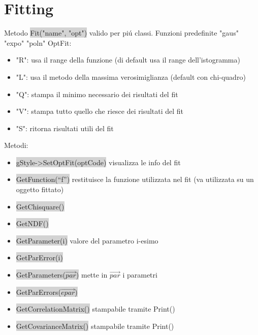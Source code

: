 \documentclass[a4paper]{article}
\begin{document}
\section{Fitting}
    Metodo \colorbox{LightGray}{Fit("name", "opt")} valido per pi\'u classi. Funzioni predefinite "gaus" "expo" "poln"
    OptFit:
    \begin{itemize}
        \item "R": usa il range della funzione (di default usa il range dell'istogramma)
        \item "L": usa il metodo della massima verosimiglianza (default con chi-quadro)
        \item "Q": stampa il minimo necessario dei risultati del fit
        \item "V": stampa tutto quello che riesce dei risultati del fit
        \item "S": ritorna risultati utili del fit
    \end{itemize}
    Metodi:
    \begin{itemize}
        \item \colorbox{LightGray}{gStyle->SetOptFit(optCode)} visualizza le info del fit
        \item \colorbox{LightGray}{GetFunction(“f”)} restituisce la funzione utilizzata nel fit (va utilizzata su un oggetto fittato)
        \item \colorbox{LightGray}{GetChisquare()}
        \item \colorbox{LightGray}{GetNDF()}
        \item \colorbox{LightGray}{GetParameter(i)} valore del parametro i-esimo
        \item \colorbox{LightGray}{GetParError(i)}
        \item \colorbox{LightGray}{GetParameters($\vec{par}$)} mette in $\vec{par}$ i parametri
        \item \colorbox{LightGray}{GetParErrors($\vec{epar}$)}
        \item \colorbox{LightGray}{GetCorrelationMatrix()} stampabile tramite Print()
        \item \colorbox{LightGray}{GetCovarianceMatrix()} stampabile tramite Print()
    \end{itemize}
\end{document}
